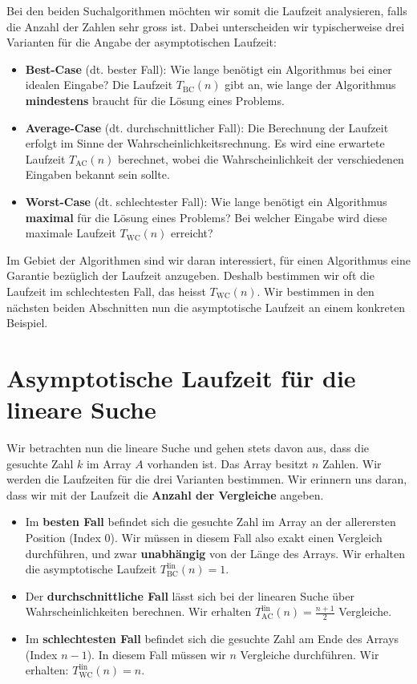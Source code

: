 Bei den beiden Suchalgorithmen möchten wir somit die Laufzeit analysieren, falls die Anzahl der Zahlen sehr gross ist. Dabei unterscheiden wir typischerweise drei Varianten für die Angabe der asymptotischen Laufzeit:

\begin{itemize}
	\item \textbf{Best-Case} (dt. bester Fall): Wie lange benötigt ein Algorithmus bei einer idealen Eingabe? Die Laufzeit $T_{\text{BC}}(n)$ gibt an, wie lange der Algorithmus \textbf{mindestens} braucht für die Lösung eines Problems.
	\item \textbf{Average-Case} (dt. durchschnittlicher Fall): Die Berechnung der Laufzeit erfolgt im Sinne der Wahrscheinlichkeitsrechnung. Es wird eine erwartete Laufzeit $T_{\text{AC}}(n)$ berechnet, wobei die Wahrscheinlichkeit der verschiedenen Eingaben bekannt sein sollte.
	\item \textbf{Worst-Case} (dt. schlechtester Fall): Wie lange benötigt ein Algorithmus \textbf{maximal} für die Lösung eines Problems? Bei welcher Eingabe wird diese maximale Laufzeit $T_{\text{WC}}(n)$ erreicht?
\end{itemize}

Im Gebiet der Algorithmen sind wir daran interessiert, für einen Algorithmus eine Garantie bezüglich der Laufzeit anzugeben. Deshalb bestimmen wir oft die Laufzeit im schlechtesten Fall, das heisst $T_{\text{WC}}(n)$. Wir bestimmen in den nächsten beiden Abschnitten nun die asymptotische Laufzeit an einem konkreten Beispiel.

\section{Asymptotische Laufzeit für die lineare Suche}

Wir betrachten nun die lineare Suche und gehen stets davon aus, dass die gesuchte Zahl $k$ im Array $A$ vorhanden ist. Das Array besitzt $n$ Zahlen. Wir werden die Laufzeiten für die drei Varianten bestimmen. Wir erinnern uns daran, dass wir mit der Laufzeit die \textbf{Anzahl der Vergleiche} angeben.

\begin{itemize}
	\item Im \textbf{besten Fall} befindet sich die gesuchte Zahl im Array an der allerersten Position (Index $0$). Wir müssen in diesem Fall also exakt einen Vergleich durchführen, und zwar \textbf{unabhängig} von der Länge des Arrays. Wir erhalten die asymptotische Laufzeit $T_{\text{BC}}^{\text{lin}}(n) = 1$.
		\item Der \textbf{durchschnittliche Fall} lässt sich bei der linearen Suche über Wahrscheinlichkeiten berechnen. Wir erhalten $T_{\text{AC}}^{\text{lin}}(n) = \frac{n + 1}{2}$ Vergleiche.
	\item Im \textbf{schlechtesten Fall}  befindet sich die gesuchte Zahl am Ende des Arrays (Index $n-1$). In diesem Fall müssen wir $n$ Vergleiche durchführen. Wir erhalten: $T_{\text{WC}}^{\text{lin}}(n) = n$.
\end{itemize}

